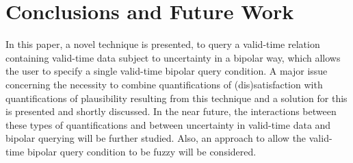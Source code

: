 \documentclass[runningheads,a4paper]{llncs}
\begin{document}
\section{Conclusions and Future Work\label{sec:conclusions}}
In this paper, a novel technique is presented, to query a valid-time relation containing valid-time data subject to uncertainty in a bipolar way, which allows the user to specify a single valid-time bipolar query condition. A major issue concerning the necessity to combine quantifications of (dis)satisfaction with quantifications of plausibility resulting from this technique and a solution for this is presented and shortly discussed. In the near future, the interactions between these types of quantifications and between uncertainty in valid-time data and bipolar querying will be further studied. Also, an approach to allow the valid-time bipolar query condition to be fuzzy will be considered.



\end{document}
